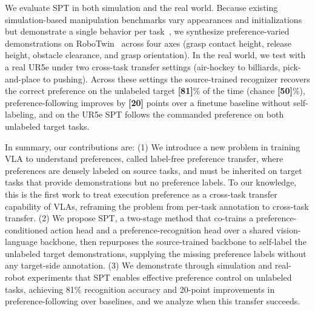 \documentclass{article}
\begin{document}

We evaluate SPT in both simulation and the real world. Because existing simulation-based manipulation benchmarks vary appearances and initializations but demonstrate a single behavior per task~\citep{libero, liberoplus}, we synthesize preference-varied demonstrations on RoboTwin~\citep{robotwin} across four axes (grasp contact height, release height, obstacle clearance, and grasp orientation). In the real world, we test with a real UR5e under two cross-task transfer settings (air-hockey to billiards, pick-and-place to pushing).
Across these settings the source-trained recognizer recovers the correct preference on the unlabeled target \textbf{[81]}\% of the time (chance \textbf{[50]}\%), preference-following improves by \textbf{[20]} points over a finetune baseline without self-labeling, and on the UR5e SPT follows the commanded preference on both unlabeled target tasks.

In summary, our contributions are: (1) We introduce a new problem in training VLA to understand preferences, called label-free preference transfer, where preferences are densely labeled on source tasks, and must be inherited on target tasks that provide demonstrations but no preference labels. To our knowledge, this is the first work to treat execution preference as a cross-task transfer capability of VLAs, reframing the problem from per-task annotation to cross-task transfer. (2) We propose SPT, a two-stage method that co-trains a preference-conditioned action head and a preference-recognition head over a shared vision-language backbone, then repurposes the source-trained backbone to self-label the unlabeled target demonstrations, supplying the missing preference labels without any target-side annotation.
(3) We demonstrate through simulation and real-robot experiments that SPT enables effective preference control on unlabeled tasks, achieving 81\% recognition accuracy and 20-point improvements in preference-following over baselines, and we analyze when this transfer succeeds.

 


\end{document}
